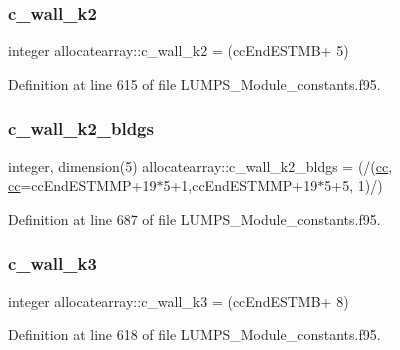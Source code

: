 \subsubsection{\texorpdfstring{c\+\_\+wall\+\_\+k2}{c\_wall\_k2}}
{\footnotesize\ttfamily integer allocatearray\+::c\+\_\+wall\+\_\+k2 = (cc\+End\+E\+S\+T\+MB+ 5)}



Definition at line 615 of file L\+U\+M\+P\+S\+\_\+\+Module\+\_\+constants.\+f95.

\mbox{\label{namespaceallocatearray_aa1c4bb9d1b4557d6980c73a3c27feba8}} 
\subsubsection{\texorpdfstring{c\+\_\+wall\+\_\+k2\+\_\+bldgs}{c\_wall\_k2\_bldgs}}
{\footnotesize\ttfamily integer, dimension(5) allocatearray\+::c\+\_\+wall\+\_\+k2\+\_\+bldgs = (/(\hyperlink{namespaceallocatearray_ac863c81704eb507dee10f5e10741e10c}{cc}, \hyperlink{namespaceallocatearray_ac863c81704eb507dee10f5e10741e10c}{cc}=cc\+End\+E\+S\+T\+M\+MP+19$\ast$5+1,cc\+End\+E\+S\+T\+M\+MP+19$\ast$5+5, 1)/)}



Definition at line 687 of file L\+U\+M\+P\+S\+\_\+\+Module\+\_\+constants.\+f95.

\mbox{\label{namespaceallocatearray_ab7912b232fb3b39abf37efdcb2b7906c}} 
\subsubsection{\texorpdfstring{c\+\_\+wall\+\_\+k3}{c\_wall\_k3}}
{\footnotesize\ttfamily integer allocatearray\+::c\+\_\+wall\+\_\+k3 = (cc\+End\+E\+S\+T\+MB+ 8)}



Definition at line 618 of file L\+U\+M\+P\+S\+\_\+\+Module\+\_\+constants.\+f95.

\mbox{\label{namespaceallocatearray_a50381945e556319590186a7bd7c04cd6}} 
